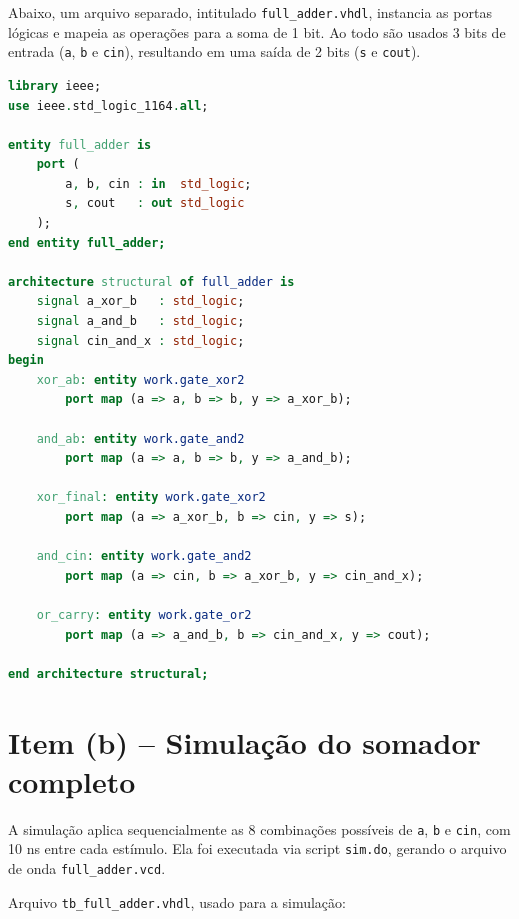 \documentclass[report, 12pt]{uftreport}
\begin{document}
Abaixo, um arquivo separado, intitulado \texttt{full\_adder.vhdl}, instancia as portas lógicas e mapeia as operações para a soma de 1 bit.
Ao todo são usados 3 bits de entrada (\texttt{a}, \texttt{b} e \texttt{cin}), resultando em uma saída de 2 bits (\texttt{s} e \texttt{cout}).



\begin{lstlisting}[language=VHDL]
library ieee;
use ieee.std_logic_1164.all;

entity full_adder is
    port (
        a, b, cin : in  std_logic;
        s, cout   : out std_logic
    );
end entity full_adder;

architecture structural of full_adder is
    signal a_xor_b   : std_logic;
    signal a_and_b   : std_logic;
    signal cin_and_x : std_logic;
begin
    xor_ab: entity work.gate_xor2
        port map (a => a, b => b, y => a_xor_b);

    and_ab: entity work.gate_and2
        port map (a => a, b => b, y => a_and_b);

    xor_final: entity work.gate_xor2
        port map (a => a_xor_b, b => cin, y => s);

    and_cin: entity work.gate_and2
        port map (a => cin, b => a_xor_b, y => cin_and_x);

    or_carry: entity work.gate_or2
        port map (a => a_and_b, b => cin_and_x, y => cout);

end architecture structural;
\end{lstlisting}

\section{Item (b) -- Simulação do somador completo}

A simulação aplica sequencialmente as 8 combinações possíveis de \texttt{a}, \texttt{b} e \texttt{cin}, com 10 ns entre cada estímulo. Ela foi executada via script \texttt{sim.do}, gerando o arquivo de onda \texttt{full\_adder.vcd}.

Arquivo \texttt{tb\_full\_adder.vhdl}, usado para a simulação:
\end{document}
